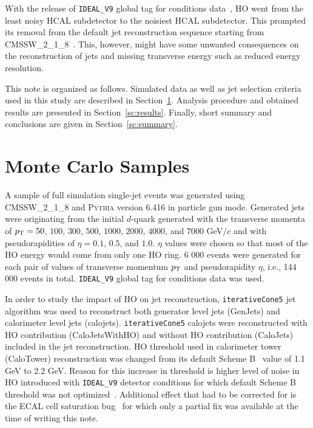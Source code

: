 \documentclass{cmspaper}
\begin{document}
With the release of \texttt{IDEAL\_V9} global tag for conditions data~\cite{ref:frontier}, HO went from the least noisy HCAL subdetector to the noisiest HCAL subdetector. This prompted its removal from the default jet reconstruction sequence starting from CMSSW\_2\_1\_8~\cite{ref:cmssw}. This, however, might have some unwanted consequences on the reconstruction of jets and missing transverse energy such as reduced energy resolution. 

This note is organized as follows. Simulated data as well as jet selection criteria used in this study are described in Section~\ref{sc:mc_samples}. Analysis procedure and obtained results are presented in Section~\ref{sc:results}. Finally, short summary and conclusions are given in Section~\ref{sc:summary}.


\section{Monte Carlo Samples}
\label{sc:mc_samples}

A sample of full simulation single-jet events was generated using CMSSW\_2\_1\_8 and P\textsc{ythia} version 6.416 in particle gun mode. Generated jets were originating from the initial $d$-quark generated with the transverse momenta of $p_\text T=50$, $100$, $300$, $500$, $1000$, $2000$, $4000$, and $7000$ GeV$/c$ and with pseudorapidities of $\eta=0.1$, $0.5$, and $1.0$. $\eta$ values were chosen so that most of the HO energy would come from only one HO ring. 6 000 events were generated for each pair of values of transverse momentum $p_\text T$ and pseudorapidity $\eta$, i.e., 144 000 events in total. \texttt{IDEAL\_V9} global tag for conditions data was used. 

In order to study the impact of HO on jet reconstruction, \texttt{iterativeCone5} jet algorithm was used to reconstruct both generator level jets (GenJets) and calorimeter level jets (calojets). \texttt{iterativeCone5} calojets were reconstructed with HO contribution (CaloJetsWithHO) and without HO contribution (CaloJets) included in the jet reconstruction. HO threshold used in calorimeter tower (CaloTower) reconstruction was changed from its default Scheme B~\cite{ref:scheme_b} value of 1.1 GeV to 2.2 GeV. Reason for this increase in threshold is higher level of noise in HO introduced with \texttt{IDEAL\_V9} detector conditions for which default Scheme B threshold was not optimized~\cite{ref:thresh}. Additional effect that had to be corrected for is the ECAL cell saturation bug~\cite{ref:ecal_cell} for which only a partial fix was available at the time of writing this note.
\end{document}
